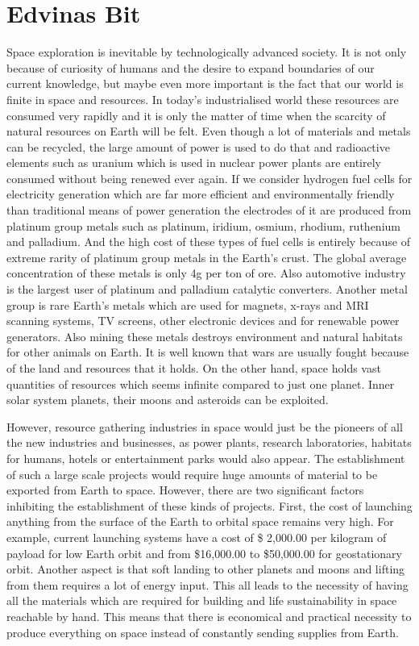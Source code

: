 \documentclass[12pt]{article}
\begin{document}
\section{Edvinas Bit}

Space exploration is inevitable by technologically advanced society. It is not only because of curiosity of humans and the desire to expand boundaries of our current knowledge, but maybe even more important is the fact that our world is finite in space and resources. In today’s industrialised world these resources are consumed very rapidly and it is only the matter of time when the scarcity of natural resources on Earth will be felt. Even though a lot of materials and
metals can be recycled, the large amount of power is used to do that and radioactive elements such as uranium which is used in nuclear power plants are entirely consumed without being renewed ever again. If we consider hydrogen fuel cells for electricity generation which are far more efficient and environmentally friendly than traditional means of power generation the electrodes of it are produced from platinum group metals such as platinum, iridium, osmium, rhodium, ruthenium and palladium. And the high cost of these types of fuel cells is entirely because of extreme rarity of platinum group metals in the Earth’s crust. The global average concentration of these metals is only 4g per ton of ore. Also automotive industry is the largest
user of platinum and palladium catalytic converters. Another metal group is rare Earth's metals which are used for magnets, x-rays and MRI scanning systems, TV screens, other electronic devices and for renewable power generators. Also mining these metals destroys environment and natural habitats for other animals on Earth. It is well known that wars are usually fought because of the land and resources that it holds. On the other hand, space holds vast quantities of
resources which seems infinite compared to just one planet. Inner solar system planets, their moons and asteroids can be exploited.

However, resource gathering industries in space would just be the pioneers of all the new industries and businesses, as power plants, research laboratories, habitats for humans, hotels or entertainment parks would also appear. The establishment of such a large scale projects would require huge amounts of material to be exported from Earth to space. However, there are two significant factors inhibiting the establishment of these kinds of projects. First, the cost of launching anything from the surface of the Earth to orbital space remains very high. For example, current launching systems have a cost of \$ 2,000.00 per kilogram of payload for low Earth orbit and from \$16,000.00 to \$50,000.00 for geostationary orbit. Another aspect is that soft landing to other planets and moons and lifting from them requires a lot of energy input. This all leads to the necessity of having all the materials which are required for building and life sustainability in space reachable by hand. This means that there is economical and practical necessity to produce everything on space instead of constantly sending supplies from Earth.
\end{document}
